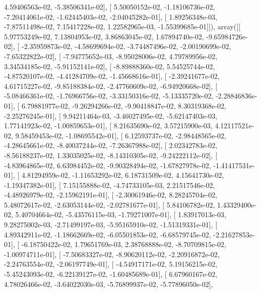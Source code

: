 \documentclass{article}
\begin{document}
          4.59406563e-02,  -5.38506341e-02],
       [  5.50050152e-02,  -1.18106736e-02,  -7.20414061e-02,
         -1.62445403e-02,  -2.04045282e-01],
       [  1.89256348e-03,  -7.87511498e-02,   7.15417228e-02,
          1.22582965e-03,  -1.55399685e-01]]), array([[  5.97753249e-02,   7.13804953e-02,   3.86863045e-02,
          1.67894740e-02,  -9.65984726e-02],
       [ -2.35959873e-02,  -4.58699694e-02,  -3.74487496e-02,
         -2.00190699e-02,  -7.65322822e-02],
       [ -7.94775652e-03,  -8.95028006e-02,   4.79789956e-02,
          3.34534185e-02,  -5.91152141e-02],
       [ -8.89888360e-02,   5.54525744e-02,  -4.87520107e-02,
         -4.41284709e-02,  -1.45668616e-01],
       [ -2.39241677e-02,   4.61715227e-02,  -9.85188384e-02,
         -2.47760609e-02,  -6.94920668e-02],
       [ -5.08466361e-02,  -1.76966756e-02,  -3.33150316e-02,
         -5.13335720e-02,  -2.28846836e-01],
       [  6.79881977e-02,  -9.26294266e-02,  -9.90418847e-02,
          8.30319368e-02,  -2.25276245e-01],
       [  9.94211464e-03,  -3.46027495e-02,  -5.62147403e-03,
          1.77141923e-02,  -1.00859653e-01],
       [  8.21635690e-02,   3.57215900e-03,   4.12117521e-02,
          9.58459453e-02,  -1.08695542e-01],
       [  6.12593737e-02,  -2.98448565e-02,  -4.28645661e-02,
         -8.40037244e-02,  -7.26367988e-02],
       [  2.02342783e-02,  -8.56188237e-02,   1.33035025e-02,
         -8.14310305e-02,  -9.24222112e-02],
       [ -4.83964865e-02,   6.63984452e-02,  -9.90328494e-02,
         -1.67827978e-02,  -1.41417531e-01],
       [  4.81294959e-02,  -1.11653292e-02,   6.18731509e-02,
          4.15641730e-02,  -1.19347382e-01],
       [  7.15155888e-02,  -4.74733105e-03,   2.21517546e-02,
         -4.48926979e-02,  -2.15962191e-01],
       [ -2.30061946e-02,   8.28245704e-02,   5.48072617e-02,
         -2.63053144e-02,  -2.02781677e-01],
       [  5.84106782e-02,   1.43329400e-02,   5.40704664e-02,
         -5.43576115e-03,  -1.79271007e-01],
       [  1.83917013e-03,   9.28275002e-03,  -2.71499197e-03,
         -5.95165910e-02,  -1.51319331e-01],
       [  4.89342911e-02,  -1.18662669e-02,  -6.05501853e-02,
         -6.68579745e-02,  -2.21627853e-01],
       [ -6.18750422e-02,   1.79651769e-03,   2.38768888e-02,
         -8.70709815e-02,  -1.00974711e-01],
       [ -7.50683327e-02,  -8.90620112e-02,  -2.20916872e-02,
         -2.24763554e-02,  -2.06197749e-01],
       [ -4.54917171e-02,   5.19156215e-02,  -5.45243093e-02,
         -6.22139127e-02,  -1.60485689e-01],
       [  6.67960167e-02,   4.78026466e-02,  -3.64022030e-03,
         -5.76899937e-02,  -5.77896050e-02],
\end{document}
